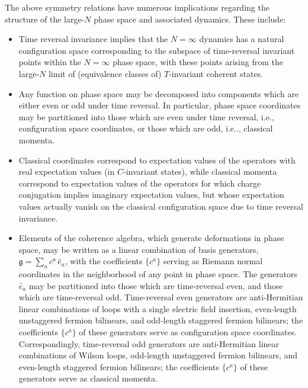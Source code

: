 \documentclass [12pt]{article}
\begin{document}
The above symmetry relations have numerous implications regarding the structure
of the large-$N$ phase space and associated dynamics.
These include:
\begin{itemize}\advance\itemsep -6pt
\item
    Time reversal invariance implies
    that the $N = \infty$ dynamics has a natural configuration space
    corresponding to the subspace of time-reversal invariant points within the
    $N = \infty$ phase space, with these points arising from the large-$N$ limit
    of (equivalence classes of) $T$-invariant coherent states.

\item
    Any function on phase space may be decomposed into components which
    are either even or odd under time reversal.
    In particular, phase space coordinates may be partitioned into those
    which are even under time reversal, i.e., configuration space coordinates,
    or those which are odd, i.e.., classical momenta.

\item
    Classical coordinates correspond to expectation values of the operators
    with real expectation values (in $C$-invariant states),
    while classical momenta correspond to expectation values of the
    operators for which charge conjugation implies imaginary expectation values,
    but whose expectation values actually vanish on the classical configuration space
    due to time reversal invariance.

\item
    Elements of the coherence algebra, which generate deformations in phase space,
    may be written as a linear combination of basis generators,
    $\mathfrak g = \sum_a c^a \, \hat e_a$, with the coefficients $\{ c^a \}$
    serving as Riemann normal coordinates in the neighborhood of any point
    in phase space.
    The generators $\hat e_a$
    may be partitioned into those which are time-reversal
    even, and those which are time-reversal odd.
    Time-reversal even generators
    are anti-Hermitian linear combinations of
    loops with a single electric field insertion,
    even-length unstaggered fermion bilinears,
    and odd-length staggered fermion bilinears;
    the coefficients $\{ c^a \}$ of these generators
    serve as configuration space coordinates.
    Correspondingly,
    time-reversal odd generators
    are anti-Hermitian linear combinations of
    Wilson loops,
    odd-length unstaggered fermion bilinears,
    and even-length staggered fermion bilinears;
    the coefficients $\{ c^a \}$ of these generators
    serve as classical momenta.


\end{itemize}
\end{document}
